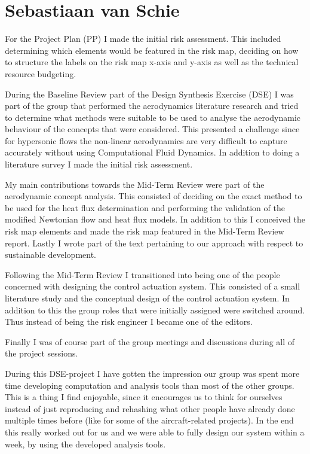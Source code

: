 \section{Sebastiaan van Schie}
For the Project Plan (PP) I made the initial risk assessment. This included determining which elements would be featured in the risk map, deciding on how to structure the labels on the risk map x-axis and y-axis as well as the technical resource budgeting.

During the Baseline Review part of the Design Synthesis Exercise (DSE) I was part of the group that performed the aerodynamics literature research and tried to determine what methods were suitable to be used to analyse the aerodynamic behaviour of the concepts that were considered. This presented a challenge since for hypersonic flows the non-linear aerodynamics are very difficult to capture accurately without using Computational Fluid Dynamics. In addition to doing a literature survey I made the initial risk assessment.

My main contributions towards the Mid-Term Review were part of the aerodynamic concept analysis. This consisted of deciding on the exact method to be used for the heat flux determination and performing the validation of the modified Newtonian flow and heat flux models. In addition to this I conceived the risk map elements and made the risk map featured in the Mid-Term Review report. Lastly I wrote part of the text pertaining to our approach with respect to sustainable development.

Following the Mid-Term Review I transitioned into being one of the people concerned with designing the control actuation system. This consisted of a small literature study and the conceptual design of the control actuation system. In addition to this the group roles that were initially assigned were switched around. Thus instead of being the risk engineer I became one of the editors.

Finally I was of course part of the group meetings and discussions during all of the project sessions. 

During this DSE-project I have gotten the impression our group was spent more time developing computation and analysis tools than most of the other groups. This is a thing I find enjoyable, since it encourages us to think for ourselves instead of just reproducing and rehashing what other people have already done multiple times before (like for some of the aircraft-related projects). In the end this really worked out for us and we were able to fully design our system within a week, by using the developed analysis tools.

